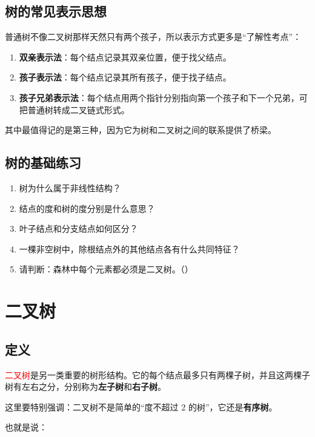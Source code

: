 \documentclass{../../note}
\begin{document}
\subsection{树的常见表示思想}

普通树不像二叉树那样天然只有两个孩子，所以表示方式更多是“了解性考点”：

\begin{enumerate}
  \item \textbf{双亲表示法}：每个结点记录其双亲位置，便于找父结点。
  \item \textbf{孩子表示法}：每个结点记录其所有孩子，便于找子结点。
  \item \textbf{孩子兄弟表示法}：每个结点用两个指针分别指向第一个孩子和下一个兄弟，可把普通树转成二叉链式形式。
\end{enumerate}

其中最值得记的是第三种，因为它为树和二叉树之间的联系提供了桥梁。

\subsection{树的基础练习}

\begin{enumerate}
  \item 树为什么属于非线性结构？
  \item 结点的度和树的度分别是什么意思？
  \item 叶子结点和分支结点如何区分？
  \item 一棵非空树中，除根结点外的其他结点各有什么共同特征？
  \item 请判断：森林中每个元素都必须是二叉树。（\hspace{1cm}）
\end{enumerate}

\section{二叉树}

\subsection{定义}

\textcolor{red}{二叉树}是另一类重要的树形结构。它的每个结点最多只有两棵子树，并且这两棵子树有左右之分，分别称为\textbf{左子树}和\textbf{右子树}。

这里要特别强调：二叉树不是简单的“度不超过 2 的树”，它还是\textbf{有序树}。

也就是说：
\end{document}
